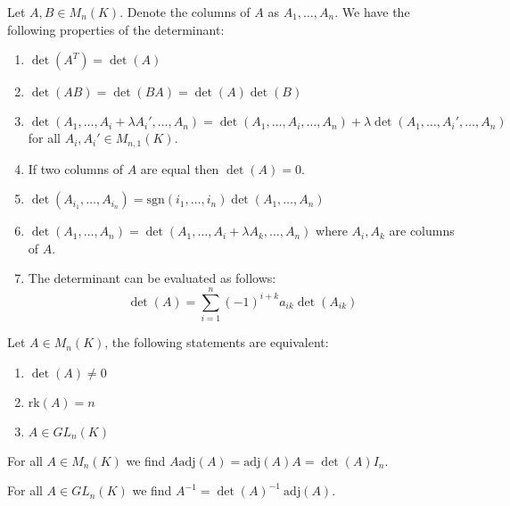         \begin{property}\label{linalgebra:determinant_properties}
            Let $A,B\in M_n(K)$. Denote the columns of $A$ as $A_1, \dotso, A_n$. We have the following properties of the determinant:
            \begin{enumerate}
				\item $\det(A^T) = \det(A)$
                \item $\det(AB) = \det(BA) = \det(A)\det(B)$
                \item $\det(A_1, \dotso, A_i+\lambda A_i', \dotso, A_n) = \det(A_1, \dotso, A_i, \dotso, A_n) + \lambda\det(A_1, \dotso,A_i', \dotso, A_n)$ for all $A_i,A_i'\in M_{n,1}(K)$.
                \item If two columns of $A$ are equal then $\det(A) = 0$.
                \item $\det(A_{i_1},\dotso,A_{i_n}) = \text{sgn}(i_1,\dotso,i_n)\det(A_1,\dotso,A_n)$
                \item $\det(A_1,\dotso,A_n) = \det(A_1,\dotso,A_i+\lambda A_k,\dotso,A_n)$ where $A_i, A_k$ are columns of $A$.
                \item The determinant can be evaluated as follows:
                	\begin{equation}
						\det(A) = \sum_{i=1}^n(-1)^{i+k}a_{ik}\det(A_{ik})
					\end{equation}
			\end{enumerate}
		\end{property}
        
        \begin{theorem}\label{linalgebra:theorem:rank_det_equivalence}
            Let $A\in M_n(K)$, the following statements are equivalent:
            \begin{enumerate}
				\item $\det(A) \neq 0$
                \item $\text{rk}(A) = n$
                \item $A\in GL_n(K)$
			\end{enumerate}
	\end{theorem}
        \begin{theorem}\label{linalgebra:theorem:adjugate_matrix}
            For all $A\in M_n(K)$ we find $A\text{adj}(A) = \text{adj}(A)A = \det(A)I_n$.
	\end{theorem}
        \begin{theorem}\label{linalgebra:theorem:determinant_inverse}
            For all $A\in GL_n(K)$ we find $A^{-1} = \det(A)^{-1}\ \text{adj}(A)$.
	\end{theorem}
        
